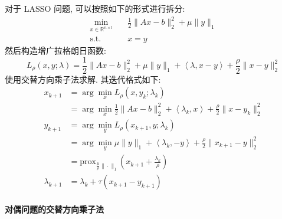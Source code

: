 \documentclass{article}
\begin{document}
对于 LASSO 问题, 可以按照如下的形式进行拆分:
\begin{equation*}
    \begin{aligned}
        \min_{x \in \mathbb{R}^{n\times l}}\quad &\frac{1}{2} \|Ax - b\|_2^2 +
        \mu \|y\|_1\\
        \text{s.t.}\quad & x=y
    \end{aligned}
\end{equation*}
然后构造增广拉格朗日函数:
\begin{equation*}
    L_\rho(x, y; \lambda) = \frac{1}{2} \|Ax - b\|_2^2 + \mu \|y\|_1 + \left<\lambda, x - y\right> + \frac{\rho}{2}\|x - y\|_2^2
\end{equation*}
使用交替方向乘子法求解. 其迭代格式如下:
\begin{align*}
    x_{k+1} &= \arg \min_{x} L_\rho(x, y_k; \lambda_k)\\
    & = \arg \min_{x} \frac{1}{2} \|Ax - b\|_2^2 + \left<\lambda_k, x\right> + \frac{\rho}{2}\|x - y_k\|_2^2\\
    y_{k+1} &= \arg \min_{y} L_\rho(x_{k+1}, y; \lambda_k)\\
    & = \arg \min_{y} \mu \|y\|_1 + \left<\lambda_k, -y\right> + \frac{\rho}{2}\|x_{k+1} - y\|_2^2\\
    & = \text{prox}_{\frac{\mu}{\rho}\|\cdot\|_1}(x_{k+1} + \frac{\lambda_k}{\rho})\\
    \lambda_{k+1} &= \lambda_k + \tau(x_{k+1} - y_{k+1})
\end{align*}

\paragraph{对偶问题的交替方向乘子法}
\end{document}

